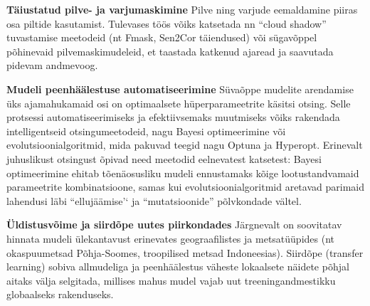 \textbf{Täiustatud pilve- ja varjumaskimine} 
Pilve ning varjude eemaldamine piiras osa
piltide kasutamist. Tulevases töös võiks katsetada nn ``cloud shadow''
tuvastamise meetodeid (nt Fmask, Sen2Cor täiendused) või sügavõppel põhinevaid
pilvemaskimudeleid, et taastada katkenud ajaread ja saavutada pidevam andmevoog.

\textbf{Mudeli peenhäälestuse automatiseerimine} 
Süvaõppe mudelite arendamise üks ajamahukamaid osi on optimaalsete
hüperparameetrite käsitsi otsing. Selle protsessi automatiseerimiseks ja
efektiivsemaks muutmiseks võiks rakendada intelligentseid otsingumeetodeid, nagu
Bayesi optimeerimine või evolutsioonialgoritmid, mida pakuvad teegid nagu Optuna
ja Hyperopt. Erinevalt juhuslikust otsingust õpivad need meetodid eelnevatest
katsetest: Bayesi optimeerimine ehitab tõenäosusliku mudeli ennustamaks kõige
lootustandvamaid parameetrite kombinatsioone, samas kui evolutsioonialgoritmid
aretavad parimaid lahendusi läbi ``ellujäämise'` ja ``mutatsioonide''
põlvkondade vältel.

\textbf{Üldistusvõime ja siirdõpe uutes piirkondades} 
Järgnevalt on soovitatav hinnata
mudeli ülekantavust erinevates geograafilistes ja metsatüüpides (nt
okaspuumetsad Põhja-Soomes, troopilised metsad Indoneesias). Siirdõpe (transfer
learning) sobiva allmudeliga ja peenhäälestus väheste lokaalsete näidete põhjal
aitaks välja selgitada, millises mahus mudel vajab uut treeningandmestikku
globaalseks rakenduseks.